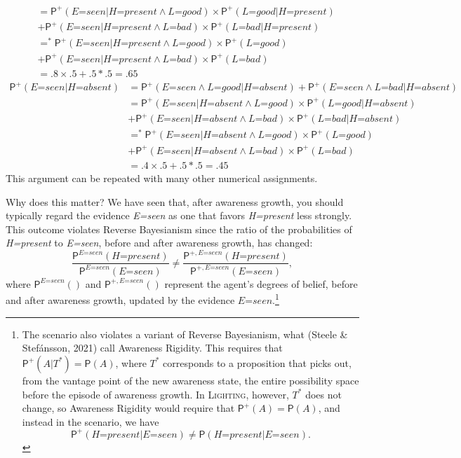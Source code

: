 \documentclass[
  11pt,
  dvipsnames,enabledeprecatedfontcommands]{scrartcl}
\newcommand{\pr}[1]{\ensuremath{\mathsf{P}(#1)}}
\newcommand{\ppr}[2]{\ensuremath{\mathsf{P}^{#1}(#2)}}
\begin{document}
{\begin{align*}
  &= \ppr{+}{\textit{E=seen} \vert \textit{H=present} \wedge \textit{L=good}}  \times \ppr{+}{\textit{L=good} \vert  \textit{H=present} }\\ & +\ppr{+}{\textit{E=seen}  \vert \textit{H=present} \wedge \textit{L=bad}} \times \ppr{+}{\textit{L=bad} \vert  \textit{H=present}}\\
  &=^* \ppr{+}{\textit{E=seen} \vert \textit{H=present} \wedge \textit{L=good}}  \times \ppr{+}{\textit{L=good}}\\ & +\ppr{+}{\textit{E=seen}  \vert \textit{H=present} \wedge \textit{L=bad}} \times \ppr{+}{\textit{L=bad}}\\
  &= .8 \times .5 +.5 *.5 = .65 
  \end{align*} \begin{align*}
  \ppr{+}{\textit{E=seen} \vert \textit{H=absent}} &= \ppr{+}{\textit{E=seen} \wedge \textit{L=good} \vert \textit{H=absent}}+\ppr{+}{\textit{E=seen} \wedge \textit{L=bad} \vert \textit{H=absent}}\\
  &= \ppr{+}{\textit{E=seen} \vert \textit{H=absent} \wedge \textit{L=good}}  \times \ppr{+}{\textit{L=good} \vert  \textit{H=absent} }\\ & +\ppr{+}{\textit{E=seen}  \vert \textit{H=absent} \wedge \textit{L=bad}} \times \ppr{+}{\textit{L=bad} \vert  \textit{H=absent}}\\
  &=^* \ppr{+}{\textit{E=seen} \vert \textit{H=absent} \wedge \textit{L=good}}  \times \ppr{+}{\textit{L=good}}\\ & +\ppr{+}{\textit{E=seen}  \vert \textit{H=absent} \wedge \textit{L=bad}} \times \ppr{+}{\textit{L=bad}}\\
  &= .4 \times .5 +.5 *.5 = .45 
  \end{align*} This argument can be repeated with many other numerical
  assignments.}

Why does this matter? We have seen that, after awareness growth, you
should typically regard the evidence \textit{E=seen} as one that favors
\textit{H=present} less strongly. This outcome violates Reverse
Bayesianism since the ratio of the probabilities of \textit{H=present}
to \textit{E=seen}, before and after awareness growth, has changed:
\[\frac{\ppr{\textit{E=seen}}{\textit{H=present}}}{\ppr{ \textit{E=seen}}{\textit{E=seen}}} \neq \frac{\ppr{+, \textit{E=seen}}{\textit{H=present}}}{\ppr{+, \textit{E=seen}}{\textit{E=seen}}},\]
where \(\ppr{\textit{E=seen}}{}\) and \(\ppr{+, \textit{E=seen}}{}\)
represent the agent's degrees of belief, before and after awareness
growth, updated by the evidence \(\textit{E=seen}\).\footnote{The
  scenario also violates a variant of Reverse Bayesianism, what (Steele
  \& Stefánsson, 2021) call Awareness Rigidity. This requires that
  \(\ppr{+}{A \vert T^*}=\pr{A}\), where \(T^*\) corresponds to a
  proposition that picks out, from the vantage point of the new
  awareness state, the entire possibility space before the episode of
  awareness growth. In \textsc{Lighting}, however, \(T^*\) does not
  change, so Awareness Rigidity would require that
  \(\ppr{+}{A}=\pr{A}\), and instead in the scenario, we have
  \[\ppr{+}{\textit{H=present} \vert \textit{E=seen}} \neq \pr{\textit{H=present} \vert \textit{E=seen}}.\]}
\end{document}
